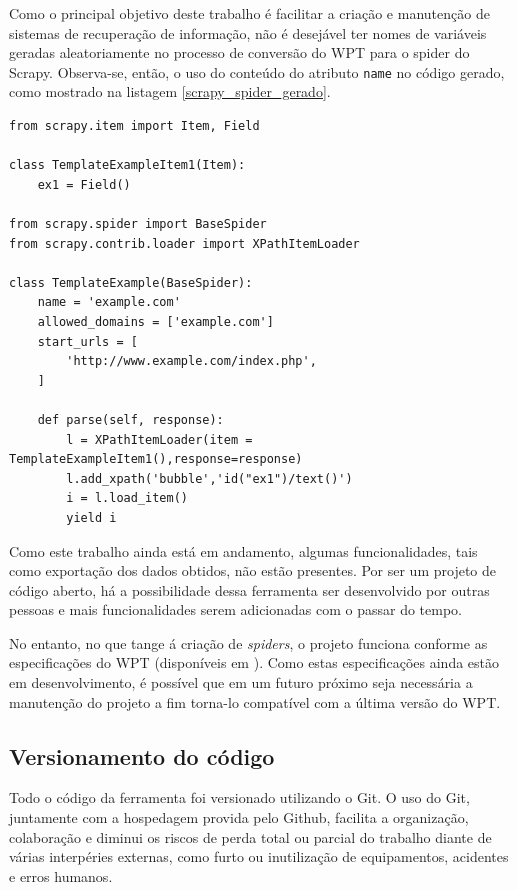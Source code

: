 Como o principal objetivo deste trabalho é facilitar a criação e manutenção de sistemas de recuperação de informação, não é desejável ter nomes de variáveis geradas aleatoriamente no processo de conversão do WPT para o spider do Scrapy. Observa-se, então, o uso do conteúdo do atributo \texttt{name} no código gerado, como mostrado na listagem \ref{scrapy_spider_gerado}.

\begin{lstlisting}[label=scrapy_spider_gerado]
from scrapy.item import Item, Field

class TemplateExampleItem1(Item):
    ex1 = Field()

from scrapy.spider import BaseSpider
from scrapy.contrib.loader import XPathItemLoader

class TemplateExample(BaseSpider):
    name = 'example.com'
    allowed_domains = ['example.com']
    start_urls = [
        'http://www.example.com/index.php',
    ]

    def parse(self, response):
        l = XPathItemLoader(item = TemplateExampleItem1(),response=response)
        l.add_xpath('bubble','id("ex1")/text()') 
        i = l.load_item()
        yield i

\end{lstlisting}


Como este trabalho ainda está em andamento, algumas funcionalidades, tais como exportação dos dados obtidos, não estão presentes. Por ser um projeto de código aberto, há a possibilidade dessa ferramenta ser desenvolvido por outras pessoas e mais funcionalidades serem adicionadas com o passar do tempo.

No entanto, no que tange á criação de \emph{spiders}, o projeto funciona conforme as especificações do WPT (disponíveis em \cite{wpt}). Como estas especificações ainda estão em desenvolvimento, é possível que em um futuro próximo seja necessária a manutenção do projeto a fim torna-lo compatível com a última versão do WPT.

\subsection{Versionamento do código}

Todo o código da ferramenta foi versionado utilizando o Git. O uso do Git, juntamente com a hospedagem provida pelo Github, facilita a organização, colaboração e diminui os riscos de perda total ou parcial do trabalho diante de várias interpéries externas, como furto ou inutilização de equipamentos, acidentes e erros humanos.

